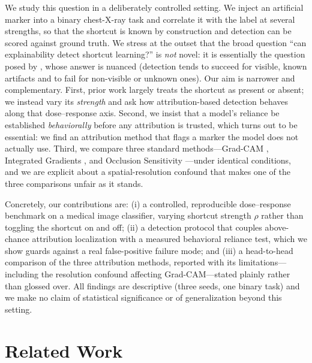\documentclass[11pt]{article}
\begin{document}
We study this question in a deliberately controlled setting. We inject an artificial marker into a
binary chest-X-ray task and correlate it with the label at several strengths, so that the shortcut
is known by construction and detection can be scored against ground truth. We stress at the outset
that the broad question ``can explainability detect shortcut learning?'' is \emph{not} novel: it is
essentially the question posed by \citet{adebayo2020debugging,adebayo2022posthoc}, whose answer is
nuanced (detection tends to succeed for visible, known artifacts and to fail for non-visible or
unknown ones). Our aim is narrower and complementary. First, prior work largely treats the shortcut
as present or absent; we instead vary its \emph{strength} and ask how attribution-based detection
behaves along that dose--response axis. Second, we insist that a model's reliance be established
\emph{behaviorally} before any attribution is trusted, which turns out to be essential: we find an
attribution method that flags a marker the model does not actually use. Third, we compare three
standard methods---Grad-CAM \citep{selvaraju2017gradcam}, Integrated Gradients
\citep{sundararajan2017axiomatic}, and Occlusion Sensitivity \citep{zeiler2014visualizing}---under
identical conditions, and we are explicit about a spatial-resolution confound that makes one of the
three comparisons unfair as it stands.

Concretely, our contributions are: (i) a controlled, reproducible dose--response benchmark on a
medical image classifier, varying shortcut strength $\rho$ rather than toggling the shortcut on and
off; (ii) a detection protocol that couples above-chance attribution localization with a measured
behavioral reliance test, which we show guards against a real false-positive failure mode; and (iii)
a head-to-head comparison of the three attribution methods, reported with its limitations---including
the resolution confound affecting Grad-CAM---stated plainly rather than glossed over. All findings
are descriptive (three seeds, one binary task) and we make no claim of statistical significance or
of generalization beyond this setting.

\section{Related Work}
\label{sec:related}
\end{document}
